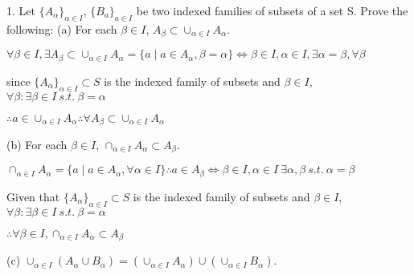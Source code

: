 1. Let $\{A_{\alpha}\}_{\alpha \in I} $, $\{ B_{a}\}_{a \in I}$ be two indexed families of subsets of a set S.
Prove the following:
(a) For each $\beta \in I$, $A_{\beta} \subset \cup_{\alpha \in I} A_{\alpha}$.

$\forall \beta \in I, \exists A_{\beta} \subset \cup_{\alpha \in I} A_{\alpha} = \{a \mid a \in A_{\alpha}, \beta = \alpha  \} \iff \beta \in I, \alpha \in I, \exists \alpha =\beta  , \forall\beta $

since $\{ A_{\alpha}\}_{\alpha \in I} \subset S$ is the indexed family of subsets and $\beta \in I$, $\forall \beta:\exists \beta \in I \  s.t. \ \beta = \alpha$ 

$\therefore a \in \cup_{\alpha \in I} A_{\alpha} \therefore \forall A_{\beta} \subset \cup_{\alpha \in I} A_{\alpha}$

(b) For each $\beta \in I$, $\cap_{\alpha \in I} A_{\alpha} \subset A_{\beta}$.

$\cap_{\alpha \in I} A_{\alpha} = \{ a \mid  a \in A_{\alpha}, \forall \alpha \in I\} \therefore a \in A_{\beta} \iff \beta \in I, \alpha\in I \ \exists \alpha, \beta \ s.t. \ \alpha = \beta$ 

Given that $\{ A_{\alpha}\}_{\alpha \in I} \subset S$ is the indexed family of subsets and $\beta \in I$, $\forall \beta:\exists \beta \in I \  s.t. \ \beta = \alpha$ 

$\therefore \forall \beta \in I, \cap_{\alpha \in I} A_{\alpha} \subset A_{\beta}$

(c) $\cup_{\alpha \in I} (A_{\alpha} \cup B_{\alpha}) = (\cup_{\alpha\in I} A_{\alpha}) \cup (\cup_{\alpha \in I} B_{\alpha})$.

$$